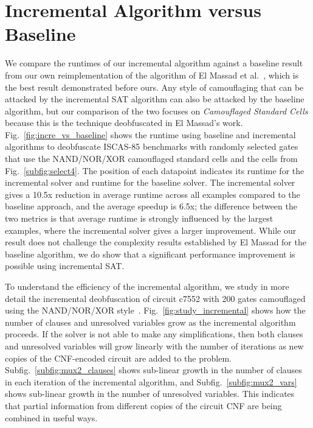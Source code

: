 \documentclass[proposal]{umassthesis}  %
\begin{document}
\section{Incremental Algorithm versus Baseline}

We compare the runtimes of our incremental algorithm against a baseline result from our own reimplementation of the algorithm of El Massad et al.~\cite{elmassad-15}, which is the best result demonstrated before ours. {Any style of camouflaging that can be attacked by the incremental SAT algorithm can also be attacked by the baseline algorithm, but our comparison of the two focuses } on \textit{Camouflaged Standard Cells} because this is the technique deobfuscated in El Massad's work.
 Fig.~\ref{fig:incre_vs_baseline} shows the runtime using baseline and incremental algorithms to deobfuscate ISCAS-85 benchmarks with randomly selected gates that use the NAND/NOR/XOR camouflaged standard cells and the cells from Fig.~\ref{subfig:select4}. The position of each datapoint indicates its runtime for the incremental solver and runtime for the baseline solver. {The incremental solver gives a 10.5x reduction in average runtime across all examples compared to the baseline approach, and the average speedup is 6.5x; the difference between the two metrics is that average runtime is strongly influenced by the largest examples, where the incremental solver gives a larger improvement. While our result does not challenge the complexity results established by El Massad for the baseline algorithm, we do show that a significant performance improvement is possible using incremental SAT.}




To understand the efficiency of the incremental algorithm, we study in more detail the incremental deobfuscation of circuit c7552 with 200 gates camouflaged using the NAND/NOR/XOR style~\cite{rajendran-13}. Fig.~\ref{fig:study_incremental} shows how the number of clauses and unresolved variables grow as the incremental algorithm proceeds. If the solver is not able to make any simplifications, then both clauses and unresolved variables will grow linearly with the number of iterations as new copies of the CNF-encoded circuit are added to the problem. Subfig.~\ref{subfig:mux2_clauses} shows sub-linear growth in the number of clauses in each iteration of the incremental algorithm, and Subfig.~\ref{subfig:mux2_vars} shows sub-linear growth in the number of unresolved variables. This indicates that partial information from different copies of the circuit CNF are being combined in useful ways. 
\end{document}
